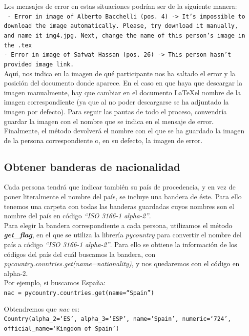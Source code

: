 \documentclass[a4paper, 12pt]{book}
\begin{document}
Los mensajes de error en estas situaciones podrían ser de la siguiente manera:\\
\texttt{
- Error in image of Alberto Bacchelli (pos. 4) -> It's impossible to download the image automatically. Please, try download it manually, and name it img4.jpg. Next, change the name of this person's image in the .tex\\
- Error in image of Safwat Hassan (pos. 26) -> This person hasn't provided image link.
}\\

Aquí, nos indica en la imagen de qué participante nos ha saltado el error y la posición del documento donde aparece. En el caso en que haya que descargar la imagen manualmente, hay que cambiar en el documento \LaTeX el nombre de la imagen correspondiente (ya que al no poder descargarse se ha adjuntado la imagen por defecto). Para seguir las pautas de todo el proceso, convendría guardar la imagen con el nombre que se indica en el mensaje de error.\\

Finalmente, el método devolverá el nombre con el que se ha guardado la imagen de la persona correspondiente o, en su defecto, la imagen de error.


\subsection{Obtener banderas de nacionalidad}
\label{subsec:banderas}
Cada persona tendrá que indicar también su país de procedencia, y en vez de poner literalmente el nombre del país, se incluye una bandera de éste. Para ello tenemos una carpeta con todas las banderas guardadas cuyos nombres son el nombre del país en código \textit{``ISO 3166-1 alpha-2''}.\\

Para elegir la bandera correspondiente a cada persona, utilizamos el método \textbf{\textit{get\_flag}}, en el que se utiliza la librería \textit{pycountry} para convertir el nombre del país a código \textit{``ISO 3166-1 alpha-2''}. Para ello se obtiene la información de los códigos del país del cuál buscamos la bandera, con \textit{pycountry.countries.get(name=nationality)}, y nos quedaremos con el código en alpha-2.\\

Por ejemplo, si buscamos España:\\
\texttt{nac = pycountry.countries.get(name=``Spain'')}

Obtendremos que \textit{nac} es:\\
\texttt{Country(alpha\_2=`ES', alpha\_3=`ESP', name=`Spain', numeric=`724', official\_name=`Kingdom of Spain')}
\end{document}
